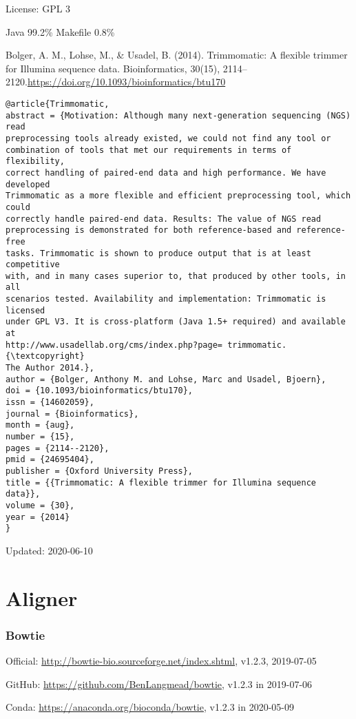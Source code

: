 \documentclass[]{article}
\begin{document}
License: GPL 3

Java 99.2\% Makefile 0.8\%

Bolger, A. M., Lohse, M., \& Usadel, B. (2014). Trimmomatic: A flexible trimmer for Illumina sequence data. Bioinformatics, 30(15), 2114–2120.\url{https://doi.org/10.1093/bioinformatics/btu170}

\begin{verbatim}
@article{Trimmomatic,
abstract = {Motivation: Although many next-generation sequencing (NGS) read
preprocessing tools already existed, we could not find any tool or
combination of tools that met our requirements in terms of flexibility,
correct handling of paired-end data and high performance. We have developed
Trimmomatic as a more flexible and efficient preprocessing tool, which could
correctly handle paired-end data. Results: The value of NGS read
preprocessing is demonstrated for both reference-based and reference-free
tasks. Trimmomatic is shown to produce output that is at least competitive
with, and in many cases superior to, that produced by other tools, in all
scenarios tested. Availability and implementation: Trimmomatic is licensed
under GPL V3. It is cross-platform (Java 1.5+ required) and available at
http://www.usadellab.org/cms/index.php?page= trimmomatic. {\textcopyright}
The Author 2014.},
author = {Bolger, Anthony M. and Lohse, Marc and Usadel, Bjoern},
doi = {10.1093/bioinformatics/btu170},
issn = {14602059},
journal = {Bioinformatics},
month = {aug},
number = {15},
pages = {2114--2120},
pmid = {24695404},
publisher = {Oxford University Press},
title = {{Trimmomatic: A flexible trimmer for Illumina sequence data}},
volume = {30},
year = {2014}
}
\end{verbatim}

Updated: 2020-06-10

\part{Aligner}
\section{Bowtie}

Official: \url{http://bowtie-bio.sourceforge.net/index.shtml}, v1.2.3, 2019-07-05

GitHub: \url{https://github.com/BenLangmead/bowtie}, v1.2.3 in 2019-07-06

Conda: \url{https://anaconda.org/bioconda/bowtie}, v1.2.3 in 2020-05-09
\end{document}
